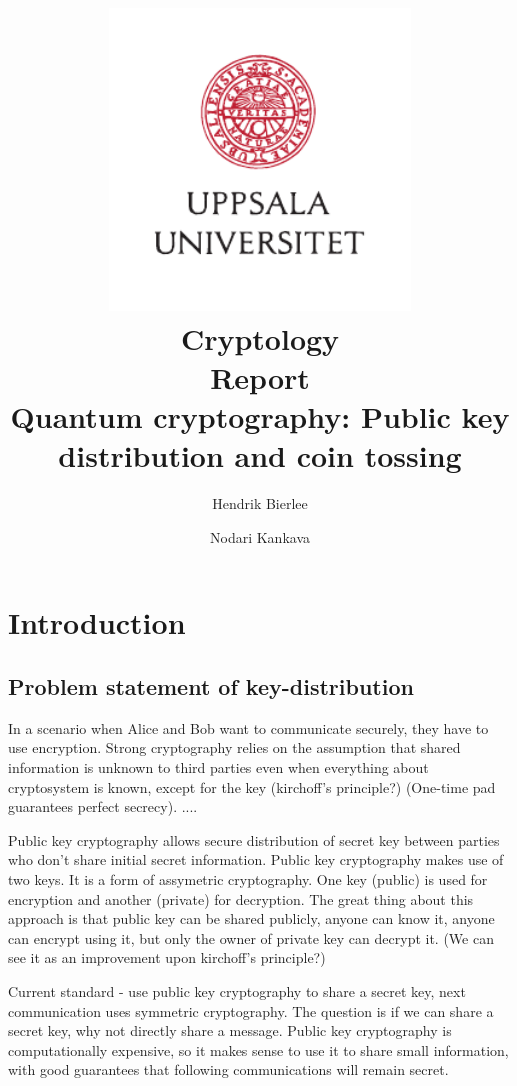 \documentclass[oneside,a4paper]{article}
\title {
	\includegraphics[width=0.6\textwidth]{UU_logo.pdf}\\[1em]
	Cryptology \\
	Report\\[1em]
	Quantum cryptography: Public key distribution and coin tossing
}
\author{
		Hendrik Bierlee \and
		Nodari Kankava
}
\begin{document}
\maketitle
\thispagestyle{empty} %
\pagebreak

\setcounter{qcounter}{1}
\newcommand{\question}[1]{\par\vspace{10px}\noindent\textbf{Question \theqcounter \stepcounter{qcounter}:} \emph{#1}\vspace{0.5em}\\\noindent}


\section{Introduction}

\subsection{Problem statement of key-distribution}
In a scenario when Alice and Bob want to communicate securely, they have to use encryption. Strong cryptography relies on the assumption that shared information is unknown to third parties even when everything about cryptosystem is known, except for the key (kirchoff's principle?) (One-time pad guarantees perfect secrecy). ....

Public key cryptography allows secure distribution of secret key between parties who don't share initial secret information. Public key cryptography makes use of two keys. It is a form of assymetric cryptography. One key (public) is used for encryption and another (private) for decryption. The great thing about this approach is that public key can be shared publicly, anyone can know it, anyone can encrypt using it, but only the owner of private key can decrypt it. (We can see it as an improvement upon kirchoff's principle?)

Current standard - use public key cryptography to share a secret key, next communication uses symmetric cryptography.
The question is if we can share a secret key, why not directly share a message. Public key cryptography is computationally expensive, so it makes sense to use it to share small information, with good guarantees that following communications will remain secret.
\end{document}
